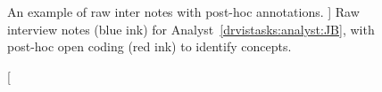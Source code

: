 \begin{figure}
    \centering
    \caption
    [
        An example of raw inter notes with post-hoc annotations.
    ]
    {
        Raw interview notes (blue ink) for Analyst~\ref{drvistasks:analyst:JB}, with post-hoc open coding (red ink) to identify concepts.
    }
    \label{fig:jbnotes}
    \centering
\end{figure}



